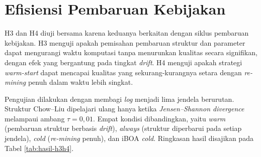 \section{Efisiensi Pembaruan Kebijakan}

H3 dan H4 diuji bersama karena keduanya berkaitan dengan siklus pembaruan kebijakan. 
H3 menguji apakah pemisahan pembaruan struktur dan parameter dapat mengurangi waktu komputasi tanpa menurunkan kualitas secara signifikan, dengan efek yang bergantung pada tingkat \textit{drift}. 
H4 menguji apakah strategi \textit{warm-start} dapat mencapai kualitas yang sekurang-kurangnya setara dengan \textit{re-mining} penuh dalam waktu lebih singkat.

Pengujian dilakukan dengan membagi \textit{log} menjadi lima jendela berurutan. 
Struktur Chow–Liu dipelajari ulang hanya ketika \textit{Jensen–Shannon divergence} melampaui ambang $\tau=0{,}01$. 
Empat kondisi dibandingkan, yaitu \textit{warm} (pembaruan struktur berbasis \textit{drift}), \textit{always} (struktur diperbarui pada setiap jendela), \textit{cold} (\textit{re-mining} penuh), dan iBOA \textit{cold}. 
Ringkasan hasil disajikan pada Tabel \ref{tab:hasil-h3h4}.

